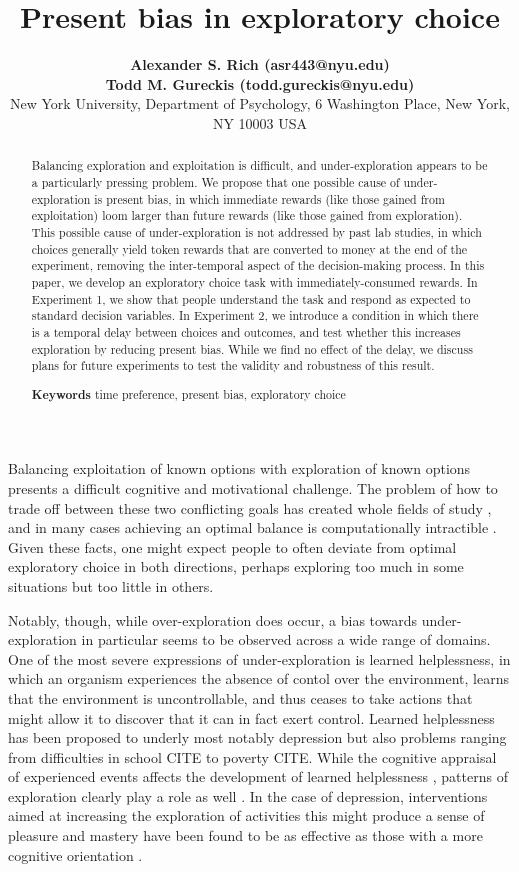 \documentclass[10pt,letterpaper]{article}
\title{Present bias in exploratory choice}
\author{  {\large \bf Alexander S. Rich (asr443@nyu.edu)} \\ {\large\bf Todd M. Gureckis (todd.gureckis@nyu.edu)}\\
        New York University, Department of Psychology, 6 Washington Place, New York, NY 10003 USA}
\begin{document}
\maketitle

\begin{abstract}

  Balancing exploration and exploitation is difficult, and under-exploration
  appears to be a particularly pressing problem. We propose that one possible cause of
  under-exploration is present bias, in which immediate rewards (like those
  gained from exploitation) loom larger than future rewards (like those
  gained from exploration). This possible cause of under-exploration is not
  addressed by past lab studies, in which choices generally yield token rewards
  that are converted to money at the end of the experiment, removing the
  inter-temporal aspect of the decision-making process. In this paper, we
  develop an exploratory choice task with immediately-consumed rewards. In
  Experiment 1, we show that people understand the task and respond as expected
  to standard decision variables. In Experiment 2, we introduce a condition in
  which there is a temporal delay between choices and outcomes, and test whether
  this increases exploration by reducing present bias. While we find no effect
  of the delay, we discuss plans for future experiments to test the validity and
  robustness of this result.

  \textbf{Keywords} time preference, present bias, exploratory choice
\end{abstract}

Balancing exploitation of known options with exploration of known options
presents a difficult cognitive and motivational challenge. The problem of how to
trade off between these two conflicting goals has created whole fields of study
\citep{Mehlhorn2015, sutton1998reinforcement}, and in many cases achieving an
optimal balance is computationally intractible \citep{Guez2013}. Given these
facts, one might expect people to often deviate from optimal exploratory choice
in both directions, perhaps exploring too much in some situations but too little
in others.

Notably, though, while over-exploration does occur, a bias towards under-exploration in particular seems to be
observed across a wide range of domains. One of the most severe
expressions of under-exploration is learned helplessness, in which an organism
experiences the absence of contol over the environment, learns that the
environment is uncontrollable, and thus ceases to take actions that might allow
it to discover that it can in fact exert control. Learned helplessness has been proposed to
underly most notably depression \citep{Abramson1978, Abramson1989} but also
problems ranging from difficulties in school CITE to poverty CITE.
While the cognitive appraisal of experienced events affects the development of
learned helplessness \citep{Abramson1978}, patterns of exploration clearly play
a role as well \citep{Huys2009, Teodorescu2014a}. In the case of depression,
interventions aimed at increasing the exploration of activities this might
produce a sense of pleasure and mastery have been found to be as effective as
those with a more cognitive orientation \citep{Jacobson1996}.
\end{document}

